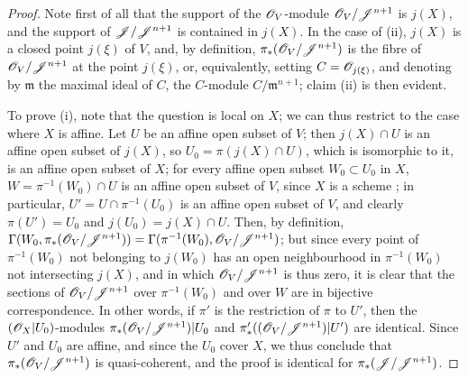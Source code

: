 \begin{proof}
Note first of all that the support of the $\mathscr{O}_V$-module $\mathscr{O}_V/\mathscr{J}^{n+1}$ is $j(X)$, and the support of $\mathscr{J}/\mathscr{J}^{n+1}$ is contained in $j(X)$.
In the case of (ii), $j(X)$ is a closed point $j(\xi)$ of $V$,
and, by definition, $\pi_*(\mathscr{O}_V/\mathscr{J}^{n+1})$ is the fibre of $\mathscr{O}_V/\mathscr{J}^{n+1}$ at the point $j(\xi)$, or, equivalently, setting $C=\mathscr{O}_{j(\xi)}$, and denoting by $\mathfrak{m}$ the maximal ideal of $C$, the $C$-module $C/\mathfrak{m}^{n+1}$;
claim (ii) is then evident.

To prove (i), note that the question is local on $X$;
we can thus restrict to the case where $X$ is affine.
Let $U$ be an affine open subset of $V$;
then $j(X)\cap U$ is an affine open subset of $j(X)$, so $U_0=\pi(j(X)\cap U)$, which is isomorphic to it, is an affine open subset of $X$;
for every affine open subset $W_0\subset U_0$ in $X$, $W=\pi^{-1}(W_0)\cap U$ is an affine open subset of $V$, since $X$ is a scheme ;
in particular, $U'=U\cap\pi^{-1}(U_0)$ is an affine open subset of $V$, and clearly $\pi(U')=U_0$ and $j(U_0)=j(X)\cap U$.
Then, by definition, $\Gamma(W_0,\pi_*(\mathscr{O}_V/\mathscr{J}^{n+1})) = \Gamma(\pi^{-1}(W_0),\mathscr{O}_V/\mathscr{J}^{n+1})$;
but since every point of $\pi^{-1}(W_0)$ not belonging to $j(W_0)$ has an open neighbourhood in $\pi^{-1}(W_0)$ not intersecting $j(X)$, and in which $\mathscr{O}_V/\mathscr{J}^{n+1}$ is thus zero, it is clear that the sections of $\mathscr{O}_V/\mathscr{J}^{n+1}$ over $\pi^{-1}(W_0)$ and over $W$ are in bijective correspondence.
In other words, if $\pi'$ is the restriction of $\pi$ to $U'$, then the $(\mathscr{O}_X|U_0)$-modules $\pi_*(\mathscr{O}_V/\mathscr{J}^{n+1})|U_0$ and $\pi'_*((\mathscr{O}_V/\mathscr{J}^{n+1})|U')$ are identical.
Since $U'$ and $U_0$ are affine, and since the $U_0$ cover $X$, we thus conclude  that $\pi_*(\mathscr{O}_V/\mathscr{J}^{n+1})$ is quasi-coherent, and the proof is identical for $\pi_*(\mathscr{J}/\mathscr{J}^{n+1})$.


\end{proof}
